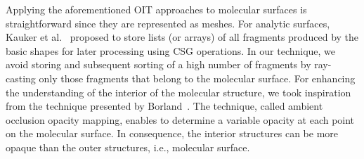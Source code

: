 Applying the aforementioned OIT approaches to molecular surfaces is straightforward since they are represented as meshes.
For analytic surfaces, Kauker et al.~\cite{kauker2013rendering} proposed to store lists (or arrays) of all fragments produced by the basic shapes for later processing using CSG operations.
In our technique, we avoid storing and subsequent sorting of a high number of fragments by ray-casting only those fragments that belong to the molecular surface.
For enhancing the understanding of the interior of the molecular structure, we took inspiration from the technique presented by Borland~\cite{borland2011ambient}. 
The technique, called ambient occlusion opacity mapping, enables to determine a variable opacity at each point on the molecular surface.
In consequence, the interior structures can be more opaque than the outer structures, i.e., molecular surface.





